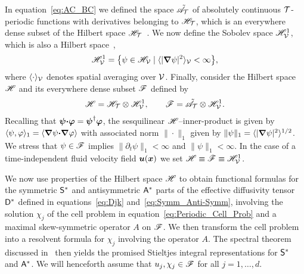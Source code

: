 \documentclass[amsa]{ipart}
\begin{document}
In equation~\eqref{eq:AC_BC} we defined the space $\tilde{\mathscr{A}}_{\mathcal{T}}$ of
absolutely continuous $\mathcal{T}$-periodic functions with derivatives
belonging to $\mathscr{H}_{\mathcal{T}}$, which is an everywhere dense subset of
the Hilbert space $\mathscr{H}_{\mathcal{T}}$~\cite{Stone:64}. We now define the Sobolev
space $\mathscr{H}^1_{\mathcal{V}}$, which is also a Hilbert
space~\cite{Bhattacharya:AAP:1999:951,Folland:95:PDEs,McOwen:2003:PDE},            
% 
\begin{align}\label{eq:Sobolev}
  \Hs^1_{\Vc}=\big\{\psi\in \Hs_{\Vc} \; | \; \langle|\bnabla \psi|^2\rangle_{\Vc}<\infty\big\}, 
\end{align}
%
where $\langle\cdot\rangle_{\mathcal{V}}$ 
denotes spatial averaging over $\mathcal{V}$.  Finally, consider the Hilbert
space $\mathscr{H}$ and its everywhere dense subset $\mathscr{F}$ defined by
%
\begin{align}\label{eq:Function_Space_Scalar}
  \Hs=\Hs_{\Tc}\otimes\Hs^1_{\Vc}, \qquad
  \Fs=\tilde{\As}_{\Tc}\otimes\Hs^1_{\Vc}.
\end{align}
%
Recalling that $\boldsymbol{\psi}\mbox{\boldmath${\cdot}$}\boldsymbol{\varphi}=\boldsymbol{\psi}^\dagger\boldsymbol{\varphi}$, the sesquilinear
$\mathscr{H}$--inner-product is given by $\langle\psi,\varphi\rangle_1=\left\langle\mbox{\boldmath${\nabla}$} \psi\mbox{\boldmath${\cdot}$}\mbox{\boldmath${\nabla}$} \varphi \right\rangle$ with associated norm
$\|\cdot\|_1$ given by $\|\psi\|_1= \langle|\mbox{\boldmath${\nabla}$} \psi|^2\rangle^{1/2}$. We stress that $\psi\in\mathscr{F}$
implies $\|\partial_t\psi\|_1<\infty$ and $\|\psi\|_1<\infty$. In the case of a time-independent
fluid velocity field $\boldsymbol{u}(\boldsymbol{x})$ we set $\mathscr{H}\equiv\mathscr{F}\equiv\mathscr{H}^1_{\mathcal{V}}$. 





We now use properties of the Hilbert space $\mathscr{H}$ to obtain
functional formulas for the symmetric $\mathsf{S}^*$ and antisymmetric
$\mathsf{A}^*$ parts of the effective diffusivity tensor $\mathsf{D}^*$ defined in
equations~\eqref{eq:Djk} and~\eqref{eq:Symm_Anti-Symm}, involving the
solution $\chi_j$ of the cell problem in
equation~\eqref{eq:Periodic_Cell_Prob} and a maximal skew-symmetric
operator $A$ on $\mathscr{F}$. We then transform the cell 
problem into a resolvent formula for $\chi_j$ involving the operator
$A$. The spectral theorem discussed in~
then yields the promised Stieltjes integral representations for
$\mathsf{S}^*$ and $\mathsf{A}^*$. We will henceforth assume that $u_j,\chi_j\in\mathscr{F}$ 
for all $j=1,\ldots,d$.
\end{document}
